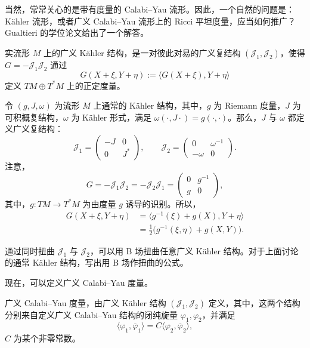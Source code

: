 当然，常常关心的是带有度量的 Calabi--Yau 流形。因此，一个自然的问题是：Kähler 流形，或者广义 Calabi--Yau 流形上的 Ricci 平坦度量，应当如何推广？Gualtieri 的学位论文给出了一个解答。

\begin{definition}\label{def:6.40}
实流形 $M$ 上的广义 Kähler 结构，是一对彼此对易的广义复结构 $(\mathcal J_1,\mathcal J_2)$，使得 $G=-\mathcal J_1\mathcal J_2$ 通过
\[
G(X+\xi,Y+\eta):=\langle G(X+\xi),Y+\eta\rangle
\]
定义 $TM\oplus T^*M$ 上的正定度量。
\end{definition}

\begin{example}\label{ex:6.41}
令 $(g,J,\omega)$ 为流形 $M$ 上通常的 Kähler 结构，其中，$g$ 为 Riemann 度量，$J$ 为可积概复结构，$\omega$ 为 Kähler 形式，满足 $\omega(\cdot,J\cdot)=g(\cdot,\cdot)$。那么，$J$ 与 $\omega$ 都定义广义复结构：
\[
\mathcal J_1=\begin{pmatrix}-J&0\\0&J^*\end{pmatrix},
\qquad
\mathcal J_2=\begin{pmatrix}0&\omega^{-1}\\-\omega&0\end{pmatrix}.
\]
注意，
\[
G=-\mathcal J_1\mathcal J_2=-\mathcal J_2\mathcal J_1
=\begin{pmatrix}0&g^{-1}\\g&0\end{pmatrix},
\]
其中，$g\colon TM\to T^*M$ 为由度量 $g$ 诱导的识别。所以，
\[
\begin{aligned}
G(X+\xi,Y+\eta)
&=\langle g^{-1}(\xi)+g(X),Y+\eta\rangle\\
&=\tfrac12\bigl(g^{-1}(\xi,\eta)+g(X,Y)\bigr).
\end{aligned}
\]
\end{example}

\begin{exercise}\label{exer:6.42}
通过同时扭曲 $\mathcal J_1$ 与 $\mathcal J_2$，可以用 B 场扭曲任意广义 Kähler 结构。对于上面讨论的通常 Kähler 结构，写出用 B 场作扭曲的公式。
\end{exercise}

现在，可以定义广义 Calabi--Yau 度量。

\begin{definition}\label{def:6.43}
广义 Calabi--Yau 度量，由广义 Kähler 结构 $(\mathcal J_1,\mathcal J_2)$ 定义，其中，这两个结构分别来自定义广义 Calabi--Yau 结构的闭纯旋量 $\varphi_1,\varphi_2$，并满足
\[
\langle\varphi_1,\overline\varphi_1\rangle
=C\langle\varphi_2,\overline\varphi_2\rangle,
\]
$C$ 为某个非零常数。
\end{definition}

